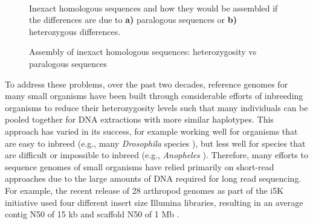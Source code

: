 \begin{figure}[htbp!]

\begin{centering}
\caption{Assembly of inexact homologous sequences: heterozygosity vs paralogous sequences}\label{figure:assembly}

 \\

\par{Inexact homologous sequences and how they would be assembled if the differences are due to \textbf{a)} paralogous sequences or \textbf{b)} heterozygous differences. }
\end{centering}
\end{figure}


\par{
To address these problems, over the past two decades, reference genomes for many small organisms have been built through considerable efforts of inbreeding organisms to reduce their heterozygosity levels such that many individuals can be pooled together for DNA extractions with more similar haplotypes. This approach has varied in its success, for example working well for organisms that are easy to inbreed (e.g., many \textit{Drosophila} species \cite{Drosophila_12_Genomes_Consortium2007-fx}), but less well for species that are difficult or impossible to inbreed (e.g., \textit{Anopheles} \cite{Neafsey2015-op}). Therefore, many efforts to sequence genomes of small organisms have relied primarily on short-read approaches due to the large amounts of DNA required for long read sequencing. For example, the recent release of 28 arthropod genomes as part of the i5K initiative used four different insert size Illumina libraries, resulting in an average contig N50 of 15 kb and scaffold N50 of 1 Mb \cite{Thomas2018-rk}.
} \\

